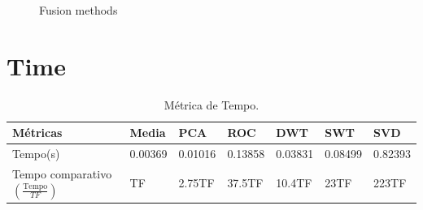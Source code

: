 \documentclass[conference]{IEEEtran}
\begin{document}
\begin{figure}[hbt]
{     }
     \caption{Fusion methods}
     \label{fusion_met}
\end{figure}

\section{Time} 
\begin{table}[hbt]
	\centering
	\tiny
	\caption{Métrica de Tempo.}
	\label{metrica_de_tempo}
\begin{tabular}{@{}lllllll@{}} \toprule
	Métricas & Media   &   PCA   &  ROC   & DWT     &  SWT     &  SVD \\ \midrule
	Tempo(s)    & 0.00369 & 0.01016 &0.13858 & 0.03831&  0.08499 & 0.82393  \\
    Tempo comparativo $\left(\frac{\text{Tempo}}{TF}\right)$& TF & 2.75TF &37.5TF & 10.4TF   &  23TF& 223TF  \\ \bottomrule
\end{tabular}
\end{table}
\end{document}
